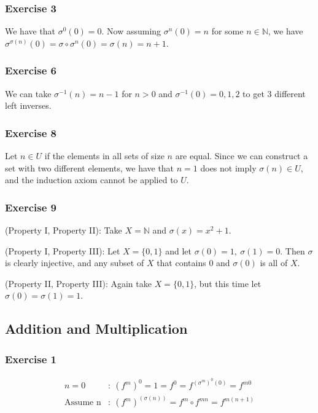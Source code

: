 \subsubsection{Exercise 3}
We have that $\sigma^0(0) = 0$. Now assuming  $\sigma^n(0) = n$ for some $n \in \mathbb{N}$,
we have $\sigma^{\sigma(n)}(0) = \sigma \circ \sigma^n(0) = \sigma(n) = n + 1$.

\subsubsection{Exercise 6}
We can take $\sigma^{-1}(n) = n - 1$ for $n > 0$ and $\sigma^{-1}(0) = 0, 1, 2$
to get 3 different left inverses.

\subsubsection{Exercise 8}
Let $n \in U$ if the elements in all sets of size $n$ are equal.
Since we can construct a set with two different elements, we have that $n = 1$ does
not imply $\sigma(n) \in U$, and the induction axiom cannot be applied to $U$.

\subsubsection{Exercise 9}
(Property I, Property II): Take $X = \mathbb{N}$ and $\sigma(x) = x^2 + 1$.

(Property I, Property III): Let $X = \{0, 1\}$ and let $\sigma(0) = 1, \: \sigma(1) = 0$.
Then $\sigma$ is clearly injective, and any subset of $X$ that contains 0 and $\sigma(0)$ 
is all of $X$.

(Property II, Property III): Again take $X = \{0, 1\}$, but this time let $\sigma(0) = \sigma(1) = 1$.

\subsection{Addition and Multiplication}

\subsubsection{Exercise 1}
\begin{align*}
        n = 0 &:  \: (f^m)^0 = 1 = f^0 = f^{(\sigma^m)^0 (0)} = f^{m 0} \\
        \text{Assume n} &: \: (f^m)^{(\sigma(n))} = f^m \circ f^{mn} = f^{m(n+1)}
\end{align*}

